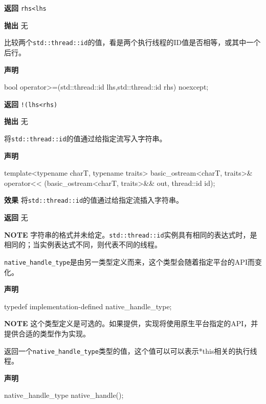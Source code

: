 \textbf{返回}
\texttt{rhs<lhs}

\textbf{抛出}
无


比较两个\texttt{std::thread::id}的值，看是两个执行线程的ID值是否相等，或其中一个后行。

\textbf{声明}

\begin{cpp}
bool operator>=(std::thread::id lhs,std::thread::id rhs) noexcept;
\end{cpp}

\textbf{返回}
\texttt{!(lhs<rhs)}

\textbf{抛出}
无


将\texttt{std::thread::id}的值通过给指定流写入字符串。

\textbf{声明}

\begin{cpp}
template<typename charT, typename traits>
basic_ostream<charT, traits>&
operator<< (basic_ostream<charT, traits>&& out, thread::id id);
\end{cpp}

\textbf{效果}
将\texttt{std::thread::id}的值通过给指定流插入字符串。

\textbf{返回}
无

\textbf{NOTE} 字符串的格式并未给定。\texttt{std::thread::id}实例具有相同的表达式时，是相同的；当实例表达式不同，则代表不同的线程。


\texttt{native\_handle\_type}是由另一类型定义而来，这个类型会随着指定平台的API而变化。

\textbf{声明}

\begin{cpp}
typedef implementation-defined native_handle_type;
\end{cpp}

\textbf{NOTE} 这个类型定义是可选的。如果提供，实现将使用原生平台指定的API，并提供合适的类型作为实现。


返回一个\texttt{native\_handle\_type}类型的值，这个值可以可以表示*this相关的执行线程。

\textbf{声明}

\begin{cpp}
native_handle_type native_handle();
\end{cpp}

